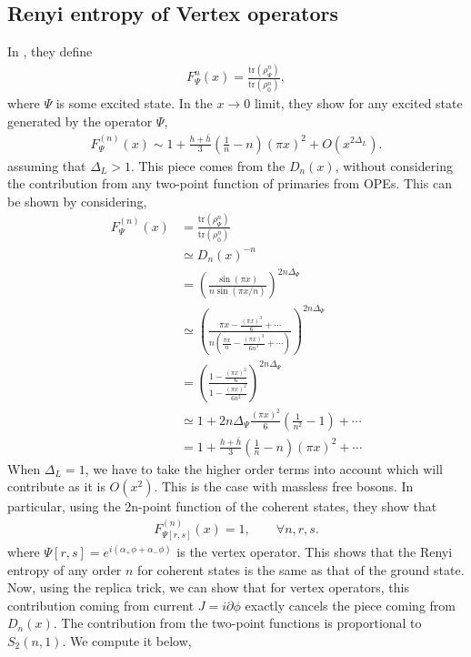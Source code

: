 \documentclass[11pt]{article}
\newcommand{\p}{\partial}
\newcommand{\lb}{\left(}
\newcommand{\rb}{\right)}
\begin{document}
\subsection{Renyi entropy of Vertex operators}\label{Renyi entropy of vertex operators}
In \cite{Alcaraz_2011}, they define 
\begin{align}
    F_{\Psi}^n(x) = \frac{\text{tr}(\rho_\Psi^n)}{\text{tr}(\rho_0^n)},
\end{align}
where $\Psi$ is some excited state. 
In the $x \to 0 $ limit, they show for any excited state generated by the operator $\Psi$,
\begin{align}
    F_\Psi^{(n)}(x) \sim 1+ \frac{h+\bar{h}}{3} \lb\frac{1}{n}-n\rb (\pi x)^2 + O(x^{2\Delta_{L}}).
\end{align}
assuming that $\Delta_L>1$.
This piece comes from the $D_n(x)$, without considering the contribution from any two-point function of primaries from OPEs. This can be shown by considering,
\begin{align}
    F^{(n)}_\Psi(x) &= \frac{\text{tr}(\rho_\Psi^n)}{\text{tr}(\rho_0^n)} \\
    &\simeq D_n(x)^{-n} \\
    &= \lb\frac{\sin(\pi x)}{n\sin(\pi x/n)}\rb^{2n\Delta_\Psi} \\
    &\simeq \lb\frac{\pi x -\frac{(\pi x)^3}{6} + \cdots } {n \lb \frac{\pi x }{n} - \frac{(\pi x)^3}{6n^3} + \cdots\rb  }\rb^{2n\Delta_\Psi}\\
    &= \lb \frac{1 - \frac{(\pi x)^2}{6}}{1- \frac{(\pi x)^2}{6n^2}}  \rb^{2n\Delta_\Psi} \\
    &\simeq 1+ 2n\Delta_\Psi \frac{(\pi x)^2}{6}\lb\frac{1}{n^2} - 1\rb + \cdots \\
    &= 1+ \frac{h + \bar{h}}{3} \lb\frac{1}{n}-n\rb (\pi x)^2 + \cdots
\end{align}
When $\Delta_L = 1$, we have to take the higher order terms into account which will contribute as it is $O(x^2)$. This is the case with massless free bosons. 
In particular, using the 2n-point function of the coherent states, they show that 
\begin{align}
    F^{(n)}_{\Psi[r,s]}(x) = 1, \qquad \forall n,r,s. 
\end{align} 
where $\Psi[r,s] = e^{i (\alpha_+ \phi + \alpha_- \phi)}$
is the vertex operator. This shows that the Renyi entropy of any order $n$ for coherent states is the same as that of the ground state. 
Now, using the replica trick, we can show that for vertex operators, this contribution coming from current $J = i \p \phi$ exactly cancels the piece coming from $D_n(x)$. The contribution from the two-point functions is proportional to $S_2(n,1)$. We compute it below,
\end{document}
